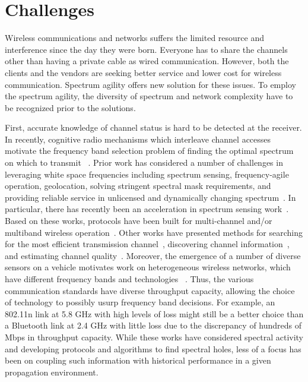 \section{Challenges}

Wireless communications and networks suffers the limited resource
and interference since the day they were born. Everyone has to
share the channels other than having a private cable as wired 
communication. However, both the clients and the vendors are 
seeking better service and lower cost for wireless communication. 
Spectrum agility offers new solution for these issues. To employ
the spectrum agility, the diversity of spectrum and network 
complexity have to be recognized prior to the solutions.

First, accurate knowledge of channel status is hard to be detected 
at the receiver. In recently, cognitive radio mechanisms which 
interleave channel accesses motivate the frequency band selection 
problem of finding the optimal spectrum on which to transmit
~\cite{ghasemi2008spectrum}. Prior work has considered a number of 
challenges in leveraging white space frequencies including spectrum 
sensing, frequency-agile operation, geolocation, solving stringent 
spectral mask requirements, and providing reliable service in unlicensed 
and dynamically changing spectrum~\cite{shellhammer2009technical}. In 
particular, there has recently been an acceleration in spectrum sensing 
work~\cite{rayanchu2011fluid, kim1996pulse,cabric2004implementation}. 
Based on these works, protocols have been built for multi-channel and/or 
multiband wireless operation~\cite{MOAR,raychaudhuri2003spectrum,sabharwal2007opportunistic}. 
Other works have presented methods for searching for the most efficient 
transmission channel~\cite{mo2005comparison}, discovering channel 
information~\cite{rayanchu2011fluid, sabharwal2007opportunistic}, and 
estimating channel quality~\cite{MOAR}. Moreover, the emergence of a 
number of diverse sensors on a vehicle motivates work on heterogeneous 
wireless networks, which have different frequency bands and technologies
~\cite{hossain2010vehicular}. Thus, the various communication standards 
have diverse throughput capacity, allowing the choice of technology 
to possibly usurp frequency band decisions. For example, an 802.11n 
link at 5.8 GHz with high levels of loss might still be a better choice 
than a Bluetooth link at 2.4 GHz with little loss due to the discrepancy 
of hundreds of Mbps in throughput capacity. While these works have 
considered spectral activity and developing protocols and algorithms to 
find spectral holes, less of a focus has been on coupling such information 
with historical performance in a given propagation environment.






